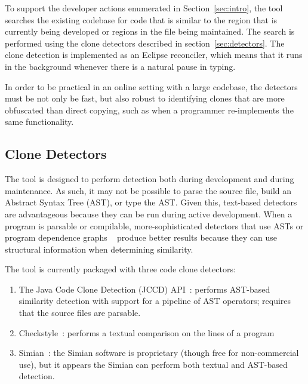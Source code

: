 \documentclass[nocopyrightspace,10pt]{sigplanconf}
\begin{document}


To support the developer actions enumerated in Section~\ref{sec:intro},
the tool searches the existing codebase for code
that is similar to the region that is currently being developed or regions
in the file being maintained. The search is performed using the clone detectors
described in section~\ref{sec:detectors}. The clone detection is implemented as
an Eclipse reconciler, which means that it runs in the background whenever there
is a natural pause in typing.

In order to be practical in an online
setting with a large codebase, the detectors must be
not only be fast, but also
robust to identifying clones that are more obfuscated than direct
copying, such as when a programmer re-implements the same
functionality.

\subsection{Clone Detectors}
The tool is designed to perform detection both during development and
during maintenance.  As such, it may not be possible to parse the source
file, build an Abstract Syntax Tree (AST), or type the AST. Given this, text-based detectors
are advantageous because they can be run during active
development. When a program is parsable or compilable,
more-sophisticated detectors that use ASTs or program
dependence graphs ~\cite{LiE2011} produce better results
because they can use structural information when determining
similarity.

\label{sec:detectors}
The tool is currently packaged with three code clone detectors:

\begin{enumerate}
\item The Java Code Clone Detection (JCCD) API~\cite{JCCD}: performs
  AST-based similarity detection with support for a pipeline of AST
  operators; requires that the source files are parsable.
\item Checkstyle~\cite{CheckStyle}: performs a textual comparison on
  the lines of a program
\item Simian~\cite{Simian}: the Simian software is proprietary (though
  free for non-commercial use), but it appears the Simian can perform
  both textual and AST-based detection.
\end{enumerate}
\end{document}

